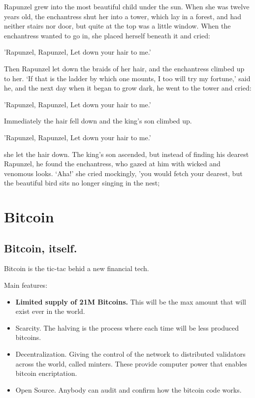 \documentclass[oneside,11pt]{memoir} %
\begin{document}
Rapunzel grew into the most beautiful child under the sun. When she was twelve years old, the enchantress shut her into a tower, which lay in a forest, and had neither stairs nor door, but quite at the top was a little window. When the enchantress wanted to go in, she placed herself beneath it and cried:

'Rapunzel, Rapunzel,
Let down your hair to me.'

Then Rapunzel let down the braids of her hair, and the enchantress climbed up to her. `If that is the ladder by which one mounts, I too will try my fortune,' said he, and the next day when it began to grow dark, he went to the tower and cried:

'Rapunzel, Rapunzel,
Let down your hair to me.'

Immediately the hair fell down and the king's son climbed up.

'Rapunzel, Rapunzel,
Let down your hair to me.'

she let the hair down. The king's son ascended, but instead of finding his dearest Rapunzel, he found the enchantress, who gazed at him with wicked and venomous looks. `Aha!' she cried mockingly, 'you would fetch your dearest, but the beautiful bird sits no longer singing in the nest;


\part{Bitcoin}
\restoregeometry


\chapter{Bitcoin, itself.}
Bitcoin is the tic-tac behid a new financial tech. 

Main features:

\begin{itemize}
	\item \textbf{Limited supply of 21M Bitcoins.} This will be the max amount that will exist ever in the world.
	\item Scarcity. The halving is the process where each time will be less produced bitcoins. 
	\item Decentralization. Giving the control of the network to distributed validators across the world, called minters. These provide computer power that enables bitcoin encriptation. 
	\item Open Source. Anybody can audit and confirm how the bitcoin code works.
\end{itemize}
\end{document}
